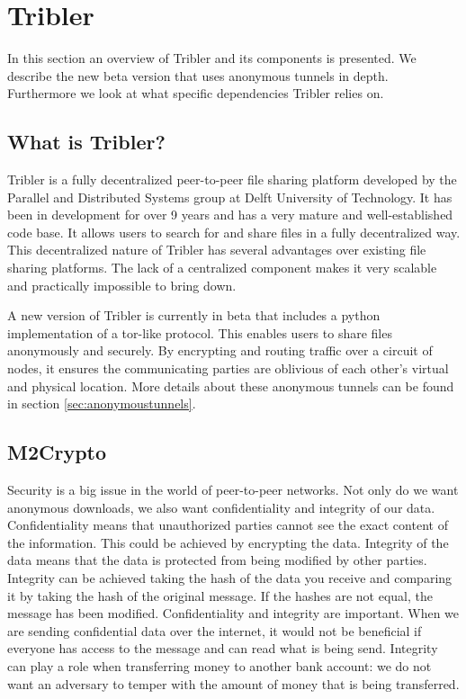 \section{Tribler}
	In this section an overview of Tribler and its components is presented. We describe the new beta version that uses anonymous tunnels in depth. Furthermore we look at what specific dependencies Tribler relies on.

	\subsection{What is Tribler?}
		Tribler is a fully decentralized peer-to-peer file sharing platform developed by the Parallel and Distributed Systems group at Delft University of Technology. It has been in development for over 9 years and has a very mature and well-established code base. It allows users to search for and share files in a fully decentralized way. This decentralized nature of Tribler has several advantages over existing file sharing platforms. The lack of a centralized component makes it very scalable and practically impossible to bring down.
		
		A new version of Tribler is currently in beta that includes a python implementation of a tor-like protocol. This enables users to share files anonymously and securely. By encrypting and routing traffic over a circuit of nodes, it ensures the communicating parties are oblivious of each other's virtual and physical location. More details about these anonymous tunnels can be found in section \ref{sec:anonymoustunnels}.

	\subsection{M2Crypto}
		Security is a big issue in the world of peer-to-peer networks. Not only do we want anonymous downloads, we also want confidentiality and integrity of our data. Confidentiality means that unauthorized parties cannot see the exact content of the information. This could be achieved by encrypting the data. Integrity of the data means that the data is protected from being modified by other parties. Integrity can be achieved taking the hash of the data you receive and comparing it by taking the hash of the original message. If the hashes are not equal, the message has been modified. Confidentiality and integrity are important. When we are sending confidential data over the internet, it would not be beneficial if everyone has access to the message and can read what is being send. Integrity can play a role when transferring money to another bank account: we do not want an adversary to temper with the amount of money that is being transferred.
		
